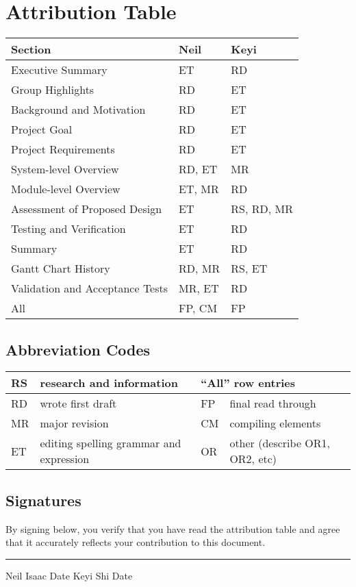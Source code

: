 \thispagestyle{empty}

\section*{Attribution Table}

\begin{tabular}{|l|l|l|}
	\hline
	\textbf{Section} & \textbf{Neil} & \textbf{Keyi} \\
	\hline \hline
	Executive Summary & ET & RD \\
	Group Highlights & RD & ET \\
	\hline
	Background and Motivation & RD & ET \\
	Project Goal & RD & ET \\
	Project Requirements & RD & ET \\
	\hline
	System-level Overview & RD, ET & MR \\
	Module-level Overview & ET, MR & RD \\
	Assessment of Proposed Design & ET & RS, RD, MR \\
	\hline
	Testing and Verification & ET & RD \\
	\hline
	Summary & ET & RD \\
	\hline
	Gantt Chart History & RD, MR & RS, ET \\
	Validation and Acceptance Tests & MR, ET & RD \\
	\hline
	All & FP, CM & FP \\
	\hline
\end{tabular}

\subsection*{Abbreviation Codes}

\begin{tabular}[width=7in]{|l|l||l|l|}
	\hline
	RS & research and information & \multicolumn{2}{l|}{``All'' row entries} \\ \hline
	RD & wrote first draft & FP & final read through \\ \hline
	MR & major revision & CM & compiling elements \\ \hline
	ET & editing spelling grammar and expression & OR & other (describe OR1, OR2, etc) \\ \hline
\end{tabular}

\subsection*{Signatures}

By signing below, you verify that you have read the attribution table and agree that it accurately reflects your contribution to this document.

\vfill

\hrule
Neil Isaac \hspace{1in} Date \hspace{1in} Keyi Shi \hspace{1in} Date

